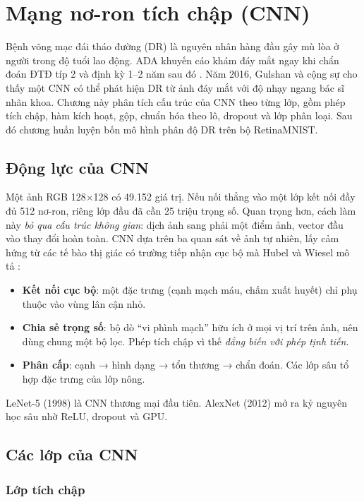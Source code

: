\chapter{Mạng nơ-ron tích chập (CNN)}
\label{chap:cnn}

Bệnh võng mạc đái tháo đường (DR) là nguyên nhân hàng đầu gây mù lòa ở người trong độ tuổi lao động. ADA khuyến cáo khám đáy mắt ngay khi chẩn đoán ĐTĐ típ 2 và định kỳ 1–2 năm sau đó \cite{ada2024}. Năm 2016, Gulshan và cộng sự \cite{gulshan2016} cho thấy một CNN có thể phát hiện DR từ ảnh đáy mắt với độ nhạy ngang bác sĩ nhãn khoa. Chương này phân tích cấu trúc của CNN theo từng lớp, gồm phép tích chập, hàm kích hoạt, gộp, chuẩn hóa theo lô, dropout và lớp phân loại. Sau đó chương huấn luyện bốn mô hình phân độ DR trên bộ RetinaMNIST.

\section{Động lực của CNN}

Một ảnh RGB 128×128 có 49.152 giá trị. Nếu nối thẳng vào một lớp kết nối đầy đủ 512 nơ-ron, riêng lớp đầu đã cần 25 triệu trọng số. Quan trọng hơn, cách làm này \emph{bỏ qua cấu trúc không gian}: dịch ảnh sang phải một điểm ảnh, vector đầu vào thay đổi hoàn toàn. CNN dựa trên ba quan sát về ảnh tự nhiên, lấy cảm hứng từ các tế bào thị giác có trường tiếp nhận cục bộ mà Hubel và Wiesel mô tả \cite{hubel1962}:
\begin{itemize}
  \item \textbf{Kết nối cục bộ}: một đặc trưng (cạnh mạch máu, chấm xuất huyết) chỉ phụ thuộc vào vùng lân cận nhỏ.
  \item \textbf{Chia sẻ trọng số}: bộ dò ``vi phình mạch'' hữu ích ở mọi vị trí trên ảnh, nên dùng chung một bộ lọc. Phép tích chập vì thế \emph{đẳng biến với phép tịnh tiến}.
  \item \textbf{Phân cấp}: cạnh → hình dạng → tổn thương → chẩn đoán. Các lớp sâu tổ hợp đặc trưng của lớp nông.
\end{itemize}
LeNet-5 (1998) \cite{lecun1998} là CNN thương mại đầu tiên. AlexNet (2012) \cite{krizhevsky2012} mở ra kỷ nguyên học sâu nhờ ReLU, dropout và GPU.

\section{Các lớp của CNN}

\subsection{Lớp tích chập}

